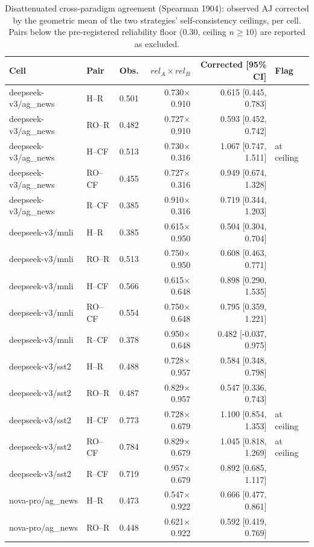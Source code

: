 \begin{table}[t]
\centering
\caption{Disattenuated cross-paradigm agreement (Spearman 1904): observed AJ corrected by the geometric mean of the two strategies' self-consistency ceilings, per cell. Pairs below the pre-registered reliability floor (0.30, ceiling $n \geq 10$) are reported as excluded.}
\label{tab:disattenuated}
\begin{tabular}{llrrrl}
\toprule
Cell & Pair & Obs. & $rel_A{\times}rel_B$ & Corrected [95\% CI] & Flag \\
\midrule
deepseek-v3/ag_news & H--R & 0.501 & 0.730$\times$0.910 & 0.615 [0.445, 0.783] &  \\
deepseek-v3/ag_news & RO--R & 0.482 & 0.727$\times$0.910 & 0.593 [0.452, 0.742] &  \\
deepseek-v3/ag_news & H--CF & 0.513 & 0.730$\times$0.316 & 1.067 [0.747, 1.511] & at ceiling \\
deepseek-v3/ag_news & RO--CF & 0.455 & 0.727$\times$0.316 & 0.949 [0.674, 1.328] &  \\
deepseek-v3/ag_news & R--CF & 0.385 & 0.910$\times$0.316 & 0.719 [0.344, 1.203] &  \\
deepseek-v3/mnli & H--R & 0.385 & 0.615$\times$0.950 & 0.504 [0.304, 0.704] &  \\
deepseek-v3/mnli & RO--R & 0.513 & 0.750$\times$0.950 & 0.608 [0.463, 0.771] &  \\
deepseek-v3/mnli & H--CF & 0.566 & 0.615$\times$0.648 & 0.898 [0.290, 1.535] &  \\
deepseek-v3/mnli & RO--CF & 0.554 & 0.750$\times$0.648 & 0.795 [0.359, 1.221] &  \\
deepseek-v3/mnli & R--CF & 0.378 & 0.950$\times$0.648 & 0.482 [-0.037, 0.975] &  \\
deepseek-v3/sst2 & H--R & 0.488 & 0.728$\times$0.957 & 0.584 [0.348, 0.798] &  \\
deepseek-v3/sst2 & RO--R & 0.487 & 0.829$\times$0.957 & 0.547 [0.336, 0.743] &  \\
deepseek-v3/sst2 & H--CF & 0.773 & 0.728$\times$0.679 & 1.100 [0.854, 1.353] & at ceiling \\
deepseek-v3/sst2 & RO--CF & 0.784 & 0.829$\times$0.679 & 1.045 [0.818, 1.269] & at ceiling \\
deepseek-v3/sst2 & R--CF & 0.719 & 0.957$\times$0.679 & 0.892 [0.685, 1.117] &  \\
nova-pro/ag_news & H--R & 0.473 & 0.547$\times$0.922 & 0.666 [0.477, 0.861] &  \\
nova-pro/ag_news & RO--R & 0.448 & 0.621$\times$0.922 & 0.592 [0.419, 0.769] &  \\

\end{tabular}
\end{table}
